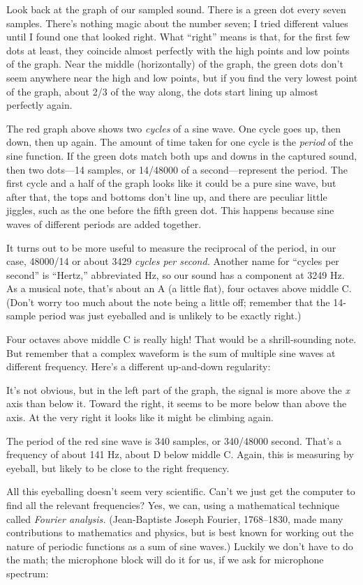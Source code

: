 \documentclass[
  letterpaper,
]{book}
\begin{document}
Look back at the graph of our sampled sound. There is a green dot every
seven samples. There's nothing magic about the number seven; I tried
different values until I found one that looked right. What ``right''
means is that, for the first few dots at least, they coincide almost
perfectly with the high points and low points of the graph. Near the
middle (horizontally) of the graph, the green dots don't seem anywhere
near the high and low points, but if you find the very lowest point of
the graph, about 2/3 of the way along, the dots start lining up almost
perfectly again.

The red graph above shows two \emph{cycles} of a sine wave. One cycle
goes up, then down, then up again. The amount of time taken for one
cycle is the \emph{period} of the sine function. If the green dots match
both ups and downs in the captured sound, then two dots---14 samples, or
14/48000 of a second---represent the period. The first cycle and a half
of the graph looks like it could be a pure sine wave, but after that,
the tops and bottoms don't line up, and there are peculiar little
jiggles, such as the one before the fifth green dot. This happens
because sine waves of different periods are added together.

It turns out to be more useful to measure the reciprocal of the period,
in our case, 48000/14 or about 3429 \emph{cycles per second.} Another
name for ``cycles per second'' is ``Hertz,'' abbreviated Hz, so our
sound has a component at 3249 Hz. As a musical note, that's about an A
(a little flat), four octaves above middle C. (Don't worry too much
about the note being a little off; remember that the 14-sample period
was just eyeballed and is unlikely to be exactly right.)

Four octaves above middle C is really high! That would be a
shrill-sounding note. But remember that a complex waveform is the sum of
multiple sine waves at different frequency. Here's a different
up-and-down regularity:

It's not obvious, but in the left part of the graph, the signal is more
above the \emph{x} axis than below it. Toward the right, it seems to be
more below than above the axis. At the very right it looks like it might
be climbing again.

The period of the red sine wave is 340 samples, or 340/48000 second.
That's a frequency of about 141 Hz, about D below middle C. Again, this
is measuring by eyeball, but likely to be close to the right frequency.

All this eyeballing doesn't seem very scientific. Can't we just get the
computer to find all the relevant frequencies? Yes, we can, using a
mathematical technique called \emph{Fourier analysis.} (Jean-Baptiste
Joseph Fourier, 1768--1830, made many contributions to mathematics and
physics, but is best known for working out the nature of periodic
functions as a sum of sine waves.) Luckily we don't have to do the math;
the microphone block will do it for us, if we ask for microphone
spectrum:
\end{document}
